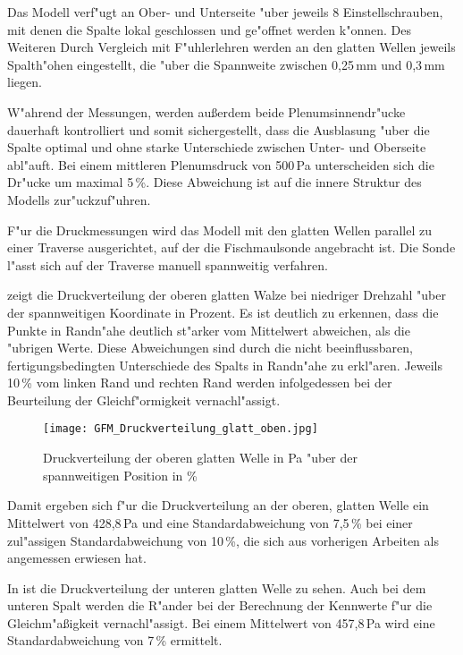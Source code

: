 Das Modell verf"ugt an Ober- und Unterseite "uber jeweils 8 Einstellschrauben, mit denen die Spalte lokal geschlossen und ge"offnet werden k"onnen. Des Weiteren 
Durch Vergleich mit F"uhlerlehren werden an den glatten Wellen jeweils Spalth"ohen eingestellt, die "uber die Spannweite zwischen 0,25\,mm und 0,3\,mm liegen.

W"ahrend der Messungen, werden au\ss{}erdem beide Plenumsinnendr"ucke dauerhaft kontrolliert und somit sichergestellt, dass die Ausblasung "uber die Spalte optimal und ohne starke Unterschiede zwischen Unter- und Oberseite abl"auft.
Bei einem mittleren Plenumsdruck von 500\,Pa unterscheiden sich die Dr"ucke um maximal 5\,\%. Diese Abweichung ist auf die innere Struktur des Modells zur"uckzuf"uhren.

F"ur die Druckmessungen wird das Modell mit den glatten Wellen parallel zu einer Traverse ausgerichtet, auf der die Fischmaulsonde angebracht ist. Die Sonde l"asst sich auf der Traverse manuell spannweitig verfahren. 

 zeigt die Druckverteilung der oberen glatten Walze bei niedriger Drehzahl "uber der spannweitigen Koordinate in Prozent. Es ist deutlich zu erkennen, dass die Punkte in Randn"ahe deutlich st"arker vom Mittelwert abweichen, als die "ubrigen Werte. Diese Abweichungen sind durch die nicht beeinflussbaren, fertigungsbedingten Unterschiede des Spalts in Randn"ahe zu erkl"aren.
Jeweils 10\,\% vom linken Rand und rechten Rand werden infolgedessen bei der Beurteilung der Gleichf"ormigkeit vernachl"assigt.

\begin{figure}[h]
	\centering
	\texttt{[image: GFM\_Druckverteilung\_glatt\_oben.jpg]}
	\caption{Druckverteilung der oberen glatten Welle in Pa "uber der spannweitigen Position in \%}
	\label{fig:Druckverteilung_glatt_oben}
\end{figure}

Damit ergeben sich f"ur die Druckverteilung an der oberen, glatten Welle ein Mittelwert von 428,8\,Pa und eine Standardabweichung von 7,5\,\% bei einer zul"assigen Standardabweichung von 10\,\%, die sich aus vorherigen Arbeiten als angemessen erwiesen hat.

In  ist die Druckverteilung der unteren glatten Welle zu sehen.
Auch bei dem unteren Spalt werden die R"ander bei der Berechnung der Kennwerte f"ur die Gleichm"a\ss{}igkeit vernachl"assigt.
Bei einem Mittelwert von 457,8\,Pa wird eine Standardabweichung von 7\,\% ermittelt.

